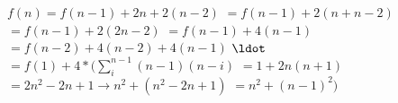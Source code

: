 $f(n) = f(n -1) + 2n + 2(n-2)$
$     = f(n -1) + 2(n + n -2)$
$     = f(n -1) + 2(2n -2)$
$     = f(n -1) + 4(n -1)$
$     = f(n -2) + 4(n-2) + 4(n-1)$
$\ldot$
$     = f(1) + 4*(\sum_i^{n-1}(n-1) (n -i)$
$     = 1 + 2n(n+1)$
$     = 2n^2 -2n +1 \rightarrow n^2 + (n^2 -2n +1)$
$     = n^2 + (n-1)^2)$
